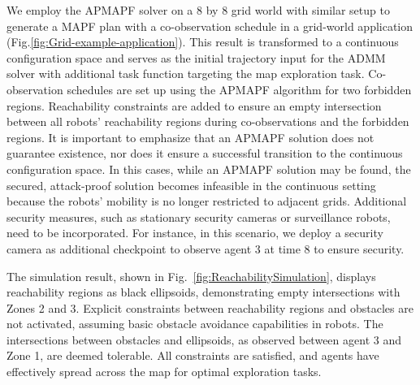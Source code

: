 \documentclass[10pt,twocolumn,twoside]{IEEEtran}
\newcommand{\news}{\color{blue}}
\begin{document}
We employ the APMAPF solver \cite{wardega2019resilience} on a 8 by 8 grid world with similar setup to generate a MAPF plan with a co-observation schedule in a grid-world application (Fig.\ref{fig:Grid-example-application}). This result is transformed to a continuous configuration space and serves as the initial trajectory input for the ADMM solver with additional task function targeting the map exploration task. Co-observation schedules are set up using the APMAPF algorithm for two forbidden regions. Reachability constraints are added to ensure an empty intersection between all robots' reachability regions during co-observations and the forbidden regions. {\news It is important to emphasize that an APMAPF solution does not guarantee existence, nor does it ensure a successful transition to the continuous configuration space. In this cases, while an APMAPF solution may be found, the secured, attack-proof solution becomes infeasible in the continuous setting because the robots' mobility is no longer restricted to adjacent grids. Additional security measures, such as stationary security cameras or surveillance robots, need to be incorporated. For instance, in this scenario, we deploy a security camera as additional checkpoint to observe agent 3 at time $8$ to ensure security.}

The simulation result, shown in Fig.~\ref{fig:ReachabilitySimulation}, displays reachability regions as black ellipsoids, demonstrating empty intersections with Zones 2 and 3. Explicit constraints between reachability regions and obstacles are not activated, assuming basic obstacle avoidance capabilities in robots. The intersections between obstacles and ellipsoids, as observed between agent 3 and Zone 1, are deemed tolerable. All constraints are satisfied, and agents have effectively spread across the map for optimal exploration tasks.

\end{document}
